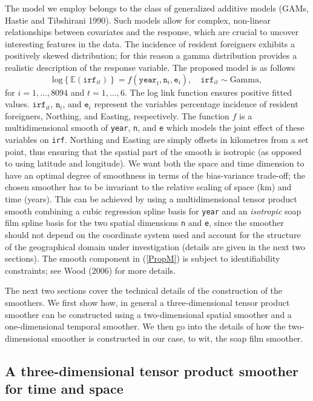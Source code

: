 \documentclass[10pt] {article}
\newcommand{\beq}{\begin{equation}}
\newcommand{\eeq}{\end{equation}}
\newcommand{\E}{\mathbb{E}}
\theoremstyle{definition}
\theoremstyle{plain}
\begin{document}
The model we employ belongs to the class of generalized additive models (GAMs, Hastie and Tibshirani 1990). Such models allow for complex, non-linear relationships between covariates and the response, which are crucial to uncover interesting features in the data. The incidence of resident foreigners exhibits a positively skewed distribution; for this reason a gamma distribution provides a realistic description of the response variable. The proposed model is as follows
\beq
\text{log}\left\{\E(\texttt{irf}_{it})\right\} = f(\texttt{year}_t,\texttt{n}_i,\texttt{e}_i), \quad \texttt{irf}_{it} \sim \text{Gamma},          
\label{PropM}
\eeq
for $i=1,\ldots,8094$ and $t=1,\ldots,6$. The log link function ensures positive fitted values. $\texttt{irf}_{it}$, $\texttt{n}_i$, and $\texttt{e}_i$ represent the variables percentage incidence of resident foreigners, Northing, and Easting, respectively. The function $f$ is a multidimensional smooth of \texttt{year}, \texttt{n}, and \texttt{e} which models the joint effect of these variables on \texttt{irf}. Northing and Easting are simply offsets in kilometres from a set point, thus ensuring that the spatial part of the smooth is isotropic (as opposed to using latitude and longitude). We want both the space and time dimension to have an optimal degree of smoothness in terms of the bias-variance trade-off; the chosen smoother has to be invariant to the relative scaling of space (km) and time (years). This can be achieved by using a multidimensional tensor product smooth combining a cubic regression spline basis for \texttt{year} and an \textit{isotropic} soap film spline basis for the two spatial dimensions \texttt{n} and \texttt{e}, since the smoother should not depend on the coordinate system used and account for the structure of the geographical domain under investigation (details are given in the next two sections). The smooth component in (\ref{PropM}) is subject to identifiability constraints; see Wood (2006) for more details.

The next two sections cover the technical details of the construction of the smoothers. We first show how, in general a three-dimensional tensor product smoother can be constructed using a two-dimensional spatial smoother and a one-dimensional temporal smoother. We then go into the details of how the two-dimensional smoother is constructed in our case, to wit, the soap film smoother.

\subsection{A three-dimensional tensor product smoother for time and space \label{3D}}
\end{document}
